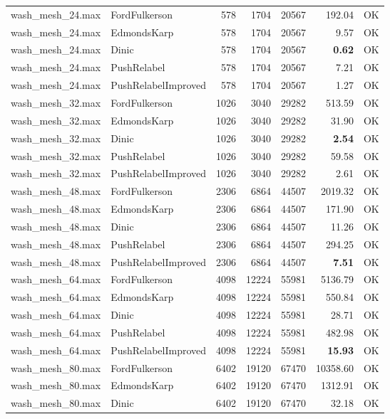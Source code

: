 \begin{longtable}{llrrrrl}
\midrule
wash\_mesh\_24.max & FordFulkerson & 578 & 1704 & 20567 & 192.04 & OK \\
wash\_mesh\_24.max & EdmondsKarp & 578 & 1704 & 20567 & 9.57 & OK \\
wash\_mesh\_24.max & Dinic & 578 & 1704 & 20567 & \textbf{0.62} & OK \\
wash\_mesh\_24.max & PushRelabel & 578 & 1704 & 20567 & 7.21 & OK \\
wash\_mesh\_24.max & PushRelabelImproved & 578 & 1704 & 20567 & 1.27 & OK \\
\midrule
wash\_mesh\_32.max & FordFulkerson & 1026 & 3040 & 29282 & 513.59 & OK \\
wash\_mesh\_32.max & EdmondsKarp & 1026 & 3040 & 29282 & 31.90 & OK \\
wash\_mesh\_32.max & Dinic & 1026 & 3040 & 29282 & \textbf{2.54} & OK \\
wash\_mesh\_32.max & PushRelabel & 1026 & 3040 & 29282 & 59.58 & OK \\
wash\_mesh\_32.max & PushRelabelImproved & 1026 & 3040 & 29282 & 2.61 & OK \\
\midrule
wash\_mesh\_48.max & FordFulkerson & 2306 & 6864 & 44507 & 2019.32 & OK \\
wash\_mesh\_48.max & EdmondsKarp & 2306 & 6864 & 44507 & 171.90 & OK \\
wash\_mesh\_48.max & Dinic & 2306 & 6864 & 44507 & 11.26 & OK \\
wash\_mesh\_48.max & PushRelabel & 2306 & 6864 & 44507 & 294.25 & OK \\
wash\_mesh\_48.max & PushRelabelImproved & 2306 & 6864 & 44507 & \textbf{7.51} & OK \\
\midrule
wash\_mesh\_64.max & FordFulkerson & 4098 & 12224 & 55981 & 5136.79 & OK \\
wash\_mesh\_64.max & EdmondsKarp & 4098 & 12224 & 55981 & 550.84 & OK \\
wash\_mesh\_64.max & Dinic & 4098 & 12224 & 55981 & 28.71 & OK \\
wash\_mesh\_64.max & PushRelabel & 4098 & 12224 & 55981 & 482.98 & OK \\
wash\_mesh\_64.max & PushRelabelImproved & 4098 & 12224 & 55981 & \textbf{15.93} & OK \\
\midrule
wash\_mesh\_80.max & FordFulkerson & 6402 & 19120 & 67470 & 10358.60 & OK \\
wash\_mesh\_80.max & EdmondsKarp & 6402 & 19120 & 67470 & 1312.91 & OK \\
wash\_mesh\_80.max & Dinic & 6402 & 19120 & 67470 & 32.18 & OK \\

\end{longtable}
